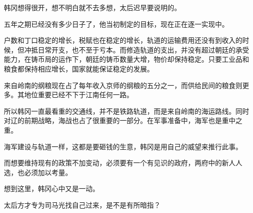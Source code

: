韩冈想得很开，想不明白就不去多想，太后迟早要说明的。

五年之期已经没有多少日子了，他当初制定的目标，现在正在逐一实现中。

户数和丁口稳定的增长，税赋也在稳定的增长，轨道的运输费用还没有到收入的时候，但冲抵日常开支，也不至于亏本。而修造轨道的支出，并没有超过朝廷的承受能力，在铸币局的运作下，朝廷的铸币数量大增，物价却保持稳定。只要工业品和粮食都保持相应增长，国家就能保证稳定的发展。

来自岭南的纲粮现在占了每年收入京师的纲粮的五分之一，而供给民间的粮食则更多。其地位重要已经不下于江南任何一路。

所以韩冈一直最看重的交通线，并不是铁路轨道，而是来自岭南的海运路线。同时对辽的前期战略，海战也占了很重要的一部分。在军事准备中，海军也是重中之重。

海军建设与轨道一样，这都是要砸钱的生意，韩冈是用自己的威望来推行此事。

而想要维持现有的政策不加变动，必须要有一个有见识的政府，两府中的新人人选，也必须加以考量。

想到这里，韩冈心中又是一动。

太后方才专为司马光找自己过来，是不是有所暗指？